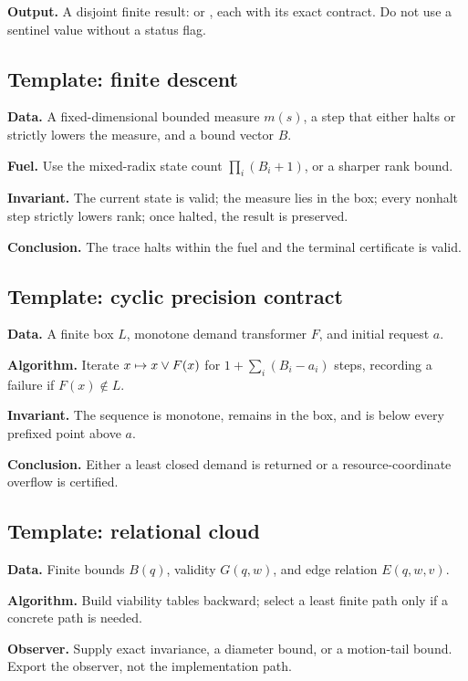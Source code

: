 \textbf{Output.}
A disjoint finite result:  or , each with its exact
contract.  Do not use a sentinel value without a status flag.

\subsection{Template: finite descent}

\textbf{Data.}
A fixed-dimensional bounded measure \(m(s)\), a step that either halts or
strictly lowers the measure, and a bound vector \(B\).

\textbf{Fuel.}
Use the mixed-radix state count \(\prod_i(B_i+1)\), or a sharper rank bound.

\textbf{Invariant.}
The current state is valid; the measure lies in the box; every nonhalt step
strictly lowers rank; once halted, the result is preserved.

\textbf{Conclusion.}
The trace halts within the fuel and the terminal certificate is valid.

\subsection{Template: cyclic precision contract}

\textbf{Data.}
A finite box \(L\), monotone demand transformer \(F\), and initial request
\(a\).

\textbf{Algorithm.}
Iterate \(x\mapsto x\mathbin{\vee} F(x)\) for
\(1+\sum_i(B_i-a_i)\) steps, recording a failure if \(F(x)\notin L\).

\textbf{Invariant.}
The sequence is monotone, remains in the box, and is below every prefixed point
above \(a\).

\textbf{Conclusion.}
Either a least closed demand is returned or a resource-coordinate overflow is
certified.

\subsection{Template: relational cloud}

\textbf{Data.}
Finite bounds \(B(q)\), validity \(G(q,w)\), and edge relation \(E(q,w,v)\).

\textbf{Algorithm.}
Build viability tables backward; select a least finite path only if a concrete
path is needed.

\textbf{Observer.}
Supply exact invariance, a diameter bound, or a motion-tail bound.  Export the
observer, not the implementation path.

